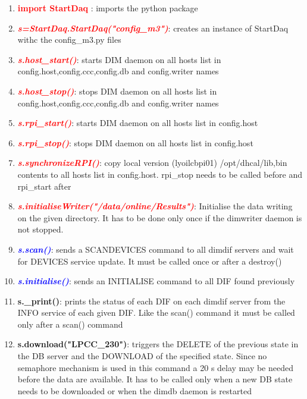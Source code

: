 \documentclass[english]{article}
\begin{document}
\begin{enumerate} 
\item \textcolor{red}{ \bf  import StartDaq} :  imports the python package

\item \textcolor{red}{\it \bf s=StartDaq.StartDaq("config\_m3")}:  creates an instance of StartDaq withc the config\_m3.py files

\item \textcolor{red}{\it \bf s.host\_start()}: starts DIM daemon on all hosts list in config.host,config.ccc,config.db and config.writer names 
\item \textcolor{red}{\it \bf s.host\_stop()}: stops DIM daemon on all hosts list in config.host,config.ccc,config.db and config.writer names
 \item \textcolor{red}{\it \bf s.rpi\_start()}: starts DIM daemon on all hosts list in config.host
\item \textcolor{red}{\it \bf s.rpi\_stop()}: stops DIM daemon on all hosts list in config.host
\item \textcolor{red}{\it \bf s.synchronizeRPI()}: copy local version (lyoilcbpi01) /opt/dhcal/lib,bin contents  to all hosts list in config.host. rpi\_stop needs to be called before and rpi\_start after
\item \textcolor{red}{\it \bf s.initialiseWriter("/data/online/Results")}: Initialise the data writing on the given directory. It has to be done only once if the dimwriter daemon is not stopped.

\item \textcolor{blue}{\it \bf s.scan()}: sends a SCANDEVICES command to all dimdif servers and wait for DEVICES service update. It must be called once or after a destroy()


\item \textcolor{blue}{\it {\bf s.initialise()}}: sends an INITIALISE command to all DIF found previously
\item {\bf s.\_print()}: prints the status of each DIF on each dimdif server from the INFO service of each given DIF. Like the scan() command it must be called only after a scan() command

\item {\bf s.download("LPCC\_230")}: triggers the DELETE of the previous state in the DB server and the DOWNLOAD of the specified state. Since no semaphore mechanism is used in this command a 20 s delay may be needed before the data are available. It has to be called only when a new DB state needs to be downloaded or when the dimdb daemon is restarted


\end{enumerate}
\end{document}
